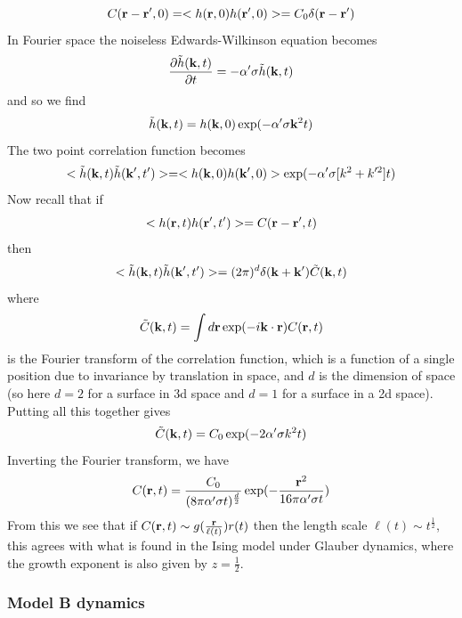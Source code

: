 \begin{equation}
C({\bf r}-{\bf r}',0)= < h({\bf r},0)h({\bf r}',0)> =C_0 \delta({\bf r}-{\bf r}')
\end{equation}
In Fourier space the noiseless Edwards-Wilkinson equation becomes
\begin{equation}
\frac{\partial\tilde h({\bf k},t)}{\partial t} = -\alpha'\sigma \tilde h({\bf k},t) 
\end{equation}
and so we find
\begin{equation}
\tilde h({\bf k},t) = h({\bf k},0)\exp(-\alpha'\sigma{\bf k}^2 t)
\end{equation}
The two point correlation function becomes
\begin{equation}
< \tilde h({\bf k},t)\tilde h({\bf k}',t')> = < h({\bf k},0)h({\bf k}',0)> \exp(- \alpha'\sigma[k^2+k'^2] t)
\end{equation}
Now recall that if 
\begin{equation}
< h({\bf r},t) h({\bf r}',t')> =C({\bf r}-{\bf r}',t)
\end{equation}
then
\begin{equation}
< \tilde h({\bf k},t)\tilde h({\bf k}',t')>= (2\pi)^d \delta({\bf k}+{\bf k}') \tilde C({\bf k},t)
\end{equation}
where 
\begin{equation}
\tilde C({\bf k},t)= \int d{\bf r} \exp(-i{\bf k}\cdot {\bf r})C({\bf r},t)
\end{equation}
is the Fourier transform of the correlation function, which is a function of a single position due to invariance by translation in space, and $d$ is the dimension of space (so here $d=2$ for a surface in 3d space and $d=1$ for a surface in a 2d space). Putting all this together gives
\begin{equation}
\tilde C({\bf k},t)= C_0 \exp(-2\alpha'\sigma k^2 t)
\end{equation}
Inverting the Fourier transform, we have
\begin{equation}
C({\bf r},t)= \frac{C_0}{(8\pi \alpha'\sigma t)^{\frac{d}{2}}} \exp(-\frac{{\bf r}^2}{16\pi \alpha'\sigma t})
\end{equation}
From this we see that if $C({\bf r},t)\sim g(\frac{{\bf r}}{\ell(t)})r(t)$ then the length scale $\ell(t)\sim t^{\frac{1}{2}}$, this agrees with what is found in the Ising model under Glauber dynamics, where the growth exponent is also given by $z=\frac{1}{2}$\cite{paul_domain_2005}.

\subsubsection{Model B dynamics}

